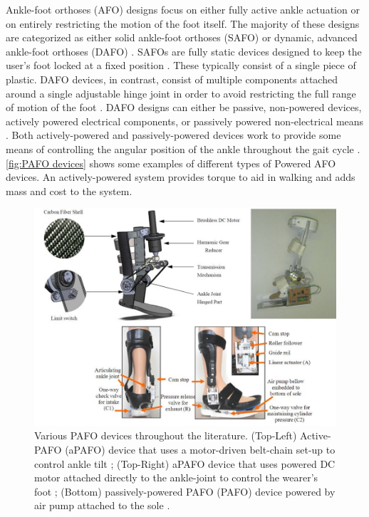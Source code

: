 Ankle-foot orthoses (AFO) designs focus on either fully active ankle actuation or on entirely restricting the motion of the foot itself. The majority of these designs are categorized as either solid ankle-foot orthoses (SAFO) or dynamic, advanced ankle-foot orthoses (DAFO) \cite{poweredAFOChina2012_6308213}. SAFOs are fully static devices designed to keep the user's foot locked at a fixed position \cite{staticAFO_6610673}. These typically consist of a single piece of plastic. DAFO devices, in contrast, consist of multiple components attached around a single adjustable hinge joint in order to avoid restricting the full range of motion of the foot \cite{poweredAFOChina2012_6308213}. DAFO designs can either be passive, non-powered devices, actively powered electrical components, or passively powered non-electrical means \cite{RussellEsposito2018}. Both actively-powered and passively-powered devices work to provide some means of controlling the angular position of the ankle throughout the gait cycle \cite{poweredAFOChina2012_6308213} \cite{actAFOFricCTRL} \cite{pneumaticAFO2009}. \autoref{fig:PAFO devices} shows some examples of different types of Powered AFO devices. An actively-powered system provides torque to aid in walking and adds mass and cost to the system.

\begin{figure}[h!]
    \centering
    \includegraphics[scale=0.30]{images/background/PAFO_designs.JPG}
    \caption[Active v. Passive PAFO]{Various PAFO devices throughout the literature. (Top-Left) Active-PAFO (aPAFO) device that uses a motor-driven belt-chain set-up to control ankle tilt \cite{poweredAFOChina2012_6308213};  (Top-Right) aPAFO device that uses powered DC motor attached directly to the ankle-joint to control the wearer's foot \cite{actAFOFricCTRL};  (Bottom) passively-powered PAFO (PAFO) device powered by air pump attached to the sole \cite{pneumaticAFO2009}.}
    \label{fig:PAFO devices}
\end{figure} 

